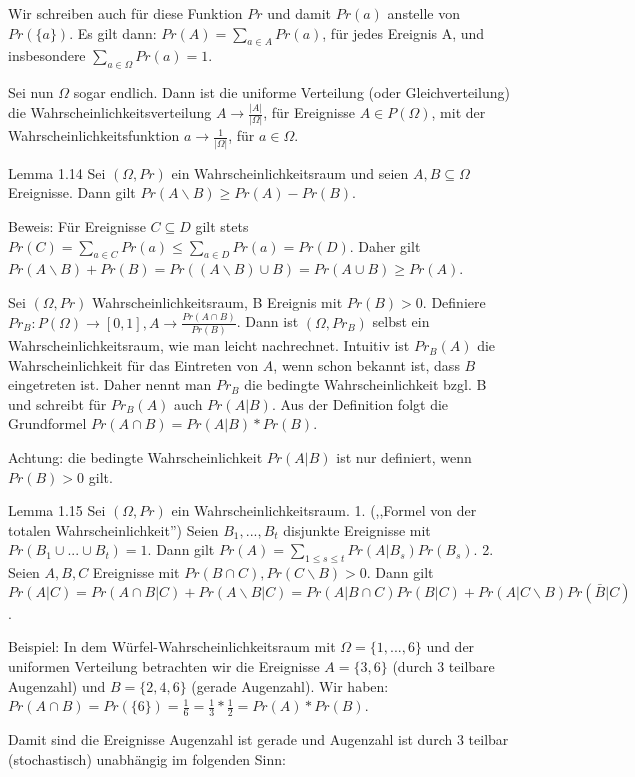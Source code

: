 \documentclass[a4paper]{article}
\begin{document}
\begin{multicols}{3}
    Wir schreiben auch für diese Funktion $Pr$ und damit $Pr(a)$ anstelle von $Pr(\{a\})$. Es gilt dann: $Pr(A)=\sum_{a\in A} Pr(a)$, für jedes Ereignis A, und insbesondere $\sum_{a\in\Omega}Pr(a) = 1$.

    Sei nun $\Omega$ sogar endlich. Dann ist die uniforme Verteilung (oder Gleichverteilung) die  Wahrscheinlichkeitsverteilung $A\rightarrow\frac{|A|}{|\Omega|}$, für Ereignisse $A\in P(\Omega)$, mit der Wahrscheinlichkeitsfunktion $a\rightarrow \frac{1}{|\Omega|}$, für $a\in\Omega$.

    Lemma 1.14 Sei $(\Omega,Pr)$ ein Wahrscheinlichkeitsraum und seien $A,B\subseteq\Omega$ Ereignisse. Dann gilt $Pr(A\backslash B)\geq Pr(A)-Pr(B)$.

    Beweis: Für Ereignisse $C\subseteq D$ gilt stets $Pr(C)=\sum_{a\in C} Pr(a)\leq \sum_{a\in D} Pr(a) = Pr(D)$.
    Daher gilt $Pr(A\backslash B) + Pr(B) = Pr((A\backslash B)\cup B) = Pr(A\cup B)\geq Pr(A)$.

    Sei $(\Omega,Pr)$ Wahrscheinlichkeitsraum, B Ereignis mit $Pr(B)> 0$. Definiere $Pr_B:P(\Omega)\rightarrow[0,1],A \rightarrow\frac{Pr(A\cap B)}{Pr(B)}$.
    Dann ist $(\Omega,Pr_B)$ selbst ein Wahrscheinlichkeitsraum, wie man leicht nachrechnet. Intuitiv ist $Pr_B(A)$ die Wahrscheinlichkeit für das Eintreten von $A$, wenn schon bekannt ist, dass $B$ eingetreten ist. Daher nennt man $Pr_B$ die bedingte Wahrscheinlichkeit bzgl. B und schreibt für $Pr_B(A)$ auch $Pr(A|B)$. Aus der Definition folgt die Grundformel $Pr(A\cap B) = Pr(A|B)*Pr(B)$.

    Achtung: die bedingte Wahrscheinlichkeit $Pr(A|B)$ ist nur definiert, wenn $Pr(B)> 0$ gilt.

    Lemma 1.15 Sei $(\Omega,Pr)$ ein Wahrscheinlichkeitsraum.
    1. (,,Formel von der totalen Wahrscheinlichkeit'') Seien $B_1,...,B_t$ disjunkte Ereignisse mit $Pr(B_1\cup...\cup B_t)=1$. Dann gilt $Pr(A)=\sum_{1\leq s\leq t} Pr(A|B_s)Pr(B_s)$.
    2. Seien $A,B,C$ Ereignisse mit $Pr(B\cap C),Pr(C\backslash B)>0$. Dann gilt $Pr(A|C)=Pr(A\cap B | C) + Pr(A\backslash B|C)= Pr(A|B\cap C)Pr(B|C) + Pr(A|C\backslash B)Pr(\bar{B}|C)$.

    Beispiel: In dem Würfel-Wahrscheinlichkeitsraum mit $\Omega=\{1,...,6\}$ und der uniformen Verteilung betrachten wir die Ereignisse $A=\{3,6\}$ (durch 3 teilbare Augenzahl) und $B=\{2,4,6\}$ (gerade Augenzahl). Wir haben: $Pr(A\cap B) = Pr(\{6\})=\frac{1}{6}=\frac{1}{3}*\frac{1}{2}=Pr(A)*Pr(B)$.

    Damit sind die Ereignisse {Augenzahl ist gerade} und {Augenzahl ist durch 3 teilbar} (stochastisch) unabhängig im folgenden Sinn:


\end{multicols}
\end{document}
